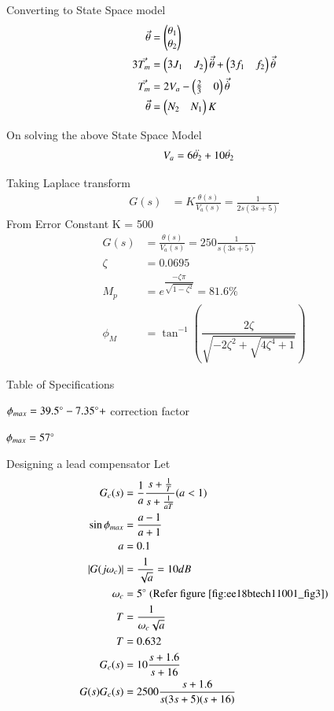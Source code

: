 Converting to State Space model
\begin{align}
    \Vec{\theta} &= \begin{pmatrix}\theta_{1} \\ \theta_{2}\end{pmatrix}
    \\
    3 \Vec{T_{m}} &= \begin{pmatrix}3J_{1} & J_{2}\end{pmatrix}\Vec{\Ddot{\theta}}+ \begin{pmatrix}3f_{1} & f_{2}\end{pmatrix}\Vec{\dot{\theta}}
    \\
    \Vec{T_{m}} &= 2V_{a} - \begin{pmatrix}\frac{2}{3} & 0\end{pmatrix}\Vec{\dot{\theta}}
    \\
    \Vec{\theta} &= \begin{pmatrix}N_{2} & N_{1}\end{pmatrix} K
\end{align}


On solving the above State Space Model
\begin{align}
    V_{a} &= 6\Ddot{\theta_{2}} + 10\Dot{\theta_{2}} \label{eq:ee18btech11001_6}
\end{align}

Taking Laplace transform
\begin{align}
   G(s) &=  K \frac{\theta (s)}{V_{a}(s)} = \frac{1}{2s(3s+5)} \label{eq:ee18btech11001_7}
\end{align}
From Error Constant  K = 500
\begin{align}
   G(s) &=  \frac{\theta (s)}{V_{a}(s)} = 250 \frac{1}{s(3s+5)} \label{eq:ee18btech11001_8}
   \\
   \zeta &= 0.0695
   \\
   M_{p} &= e^{\dfrac{-\zeta\pi}{\sqrt{1-\zeta^{2}}}} = 81.6\%
   \\
   \phi_{M} &= \tan^{-1}(\dfrac{2\zeta}{\sqrt{-2\zeta^2 + \sqrt{4\zeta^4 + 1}}})
\end{align}

\begin{table}[!ht]
\centering

\caption{Table of Specifications}
\label{table:ee18btech11001}
\end{table}

$\phi_{max} = 39.5\degree-7.35\degree+$ correction factor

$\phi_{max} = 57\degree$

Designing a lead compensator
Let 
\begin{align}
   G_{c}(s) &=  \frac{1}{a}\frac{s + \frac{1}{T}}{s + \frac{1}{aT}} (a<1) \label{eq:ee18btech11001_9}
   \\
   \sin\phi_{max} &= \dfrac{a-1}{a+1}
   \\
   a &= 0.1
   \\
   |G(j\omega_{c})| &= \frac{1}{\sqrt{a}} = 10 dB
   \\
   \omega_{c} &= 5\degree \text{  (Refer figure \ref{fig:ee18btech11001_fig3})}
   \\
   T &= \frac{1}{\omega_{c}\sqrt{a}}
   \\
   T &= 0.632
   \\
   G_{c}(s) &=  10 \frac{s + 1.6}{s + 16}
   \\
   G(s)G_{c}(s)  &= 2500 \dfrac{s+1.6}{s(3s+5)(s+16)} \label{eq:ee18btech11001_10}
\end{align}

